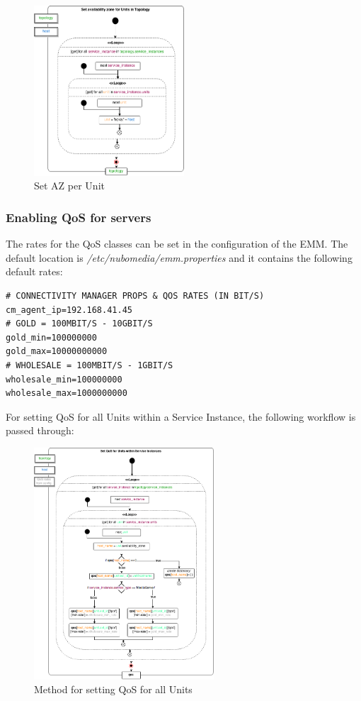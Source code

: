 \begin{figure}[H]
\centering

\includegraphics[width=0.5\textwidth]{images/implementation/cm_set_az_topology}

\caption{Set AZ per Unit}
\end{figure}

\subsubsection{Enabling QoS for servers}

The rates for the QoS classes can be set in the configuration of the EMM.
The default location is \textit{/etc/nubomedia/emm.properties} and it contains the following default rates:
\begin{lstlisting}[language=commands]
# CONNECTIVITY MANAGER PROPS & QOS RATES (IN BIT/S)
cm_agent_ip=192.168.41.45
# GOLD = 100MBIT/S - 10GBIT/S
gold_min=100000000
gold_max=10000000000
# WHOLESALE = 100MBIT/S - 1GBIT/S
wholesale_min=100000000
wholesale_max=1000000000
\end{lstlisting}

For setting QoS for all Units within a Service Instance, the following workflow is passed through:

\begin{figure}[H]
\centering

\includegraphics[width=0.6\textwidth]{images/implementation/cm_set_qos.png}

\caption{Method for setting QoS for all Units}
\end{figure}

